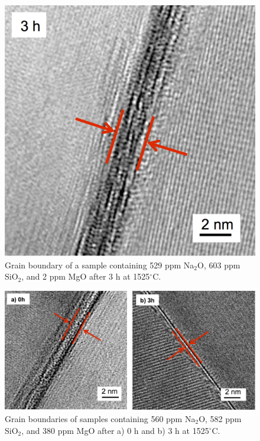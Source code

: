\newpage
\begin{figure}[H]
	\centering
	\includegraphics[width=\textwidth]{Chapter-3/Figures/Figure6.png}
	\caption{Grain boundary of a sample containing 529 ppm Na$_{2}$O, 603 ppm SiO$_{2}$, and 2 ppm MgO after 3 h at 1525$^{\circ}$C.}
	\label{Ch3-figure:Figure6}
\end{figure}

\newpage
\begin{figure}[H]
	\centering
	\includegraphics[width=\textwidth]{Chapter-3/Figures/Figure7.png}
	\caption{Grain boundaries of samples containing 560 ppm Na$_{2}$O, 582 ppm SiO$_{2}$, and 380 ppm MgO after a) 0 h and b) 3 h at 1525$^{\circ}$C.}
	\label{Ch3-figure:Figure7}
\end{figure}

